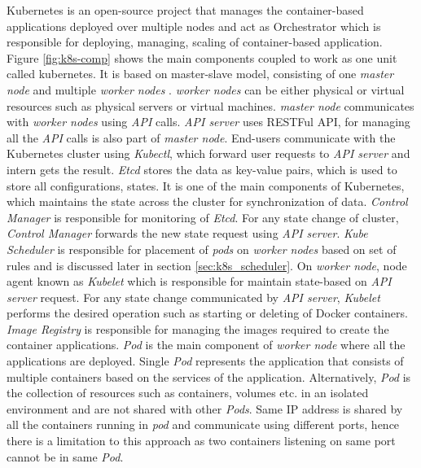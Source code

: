 Kubernetes is an open-source project that manages the container-based applications deployed over multiple nodes and act as Orchestrator which is responsible for deploying, managing, scaling of container-based application\cite{k8s-git}. Figure \ref{fig:k8s-comp} shows the main components coupled to work as one unit called kubernetes. It is based on master-slave model, consisting of one \emph{master node} and multiple \emph{worker nodes} \cite{Santos2019}. \emph{worker nodes} can be either physical or virtual resources such as physical servers or virtual machines. \emph{master node} communicates with \emph{worker nodes} using \emph{API} calls\cite{Santos2019}. \emph{API server} uses RESTFul API, for managing all the \emph{API} calls is also part of \emph{master node}. End-users communicate with the Kubernetes cluster using \emph{Kubectl}, which forward user requests to \emph{API server} and intern gets the result. \emph{Etcd} stores the data as key-value pairs, which is used to store all configurations, states. It is one of the main components of Kubernetes, which maintains the state across the cluster for synchronization of data\cite{Santos2019}. \emph{Control Manager} is responsible for monitoring of \emph{Etcd}. For any state change of cluster, \emph{Control Manager} forwards the new state request using \emph{API server}\cite{Santos2019}. \emph{Kube Scheduler} is responsible for placement of \emph{pods} on \emph{worker nodes} based on set of rules and is discussed later in section \ref{sec:k8s_scheduler}. On \emph{worker node}, node agent known as \emph{Kubelet} which is responsible for maintain state-based on \emph{API server} request\cite{Santos2019}. For any state change communicated by \emph{API server}, \emph{Kubelet} performs the desired operation such as starting or deleting of Docker containers\cite{Santos2019}. \emph{Image Registry} is responsible for managing the images required to create the container applications. \emph{Pod} is the main component of \emph{worker node} where all the applications are deployed. Single \emph{Pod} represents the application that consists of multiple containers based on the services of the application. Alternatively, \emph{Pod} is the collection of resources such as containers, volumes etc. in an isolated environment and are not shared with other \emph{Pods}\cite{Santos2019}. Same IP address is shared by all the containers running in \emph{pod} and communicate using different ports, hence there is a limitation to this approach as two containers listening on same port cannot be in same \emph{Pod}\cite{Santos2019}.
